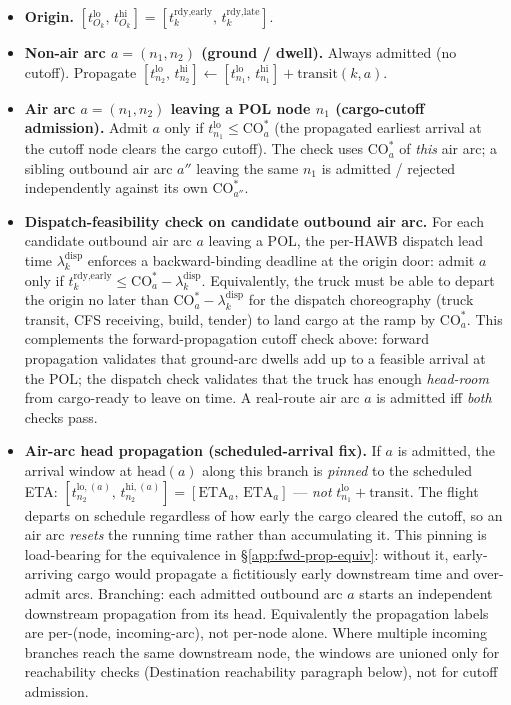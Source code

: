 \documentclass[11pt,a4paper]{article}
\theoremstyle{definition}
\begin{document}
\begin{itemize}[noitemsep]
  \item \textbf{Origin.} $[t^{\text{lo}}_{O_k},\, t^{\text{hi}}_{O_k}] =
        [t_k^{\text{rdy,early}},\, t_k^{\text{rdy,late}}]$.
  \item \textbf{Non-air arc $a = (n_1, n_2)$ (ground / dwell).} Always
        admitted (no cutoff). Propagate $[t^{\text{lo}}_{n_2},\,
        t^{\text{hi}}_{n_2}] \leftarrow [t^{\text{lo}}_{n_1},\,
        t^{\text{hi}}_{n_1}] + \text{transit}(k, a)$.
  \item \textbf{Air arc $a = (n_1, n_2)$ leaving a POL node $n_1$ (cargo-cutoff admission).}
        Admit $a$ only if $t^{\text{lo}}_{n_1} \leq \text{CO}_a^*$
        (the propagated earliest arrival at the cutoff node clears the cargo
        cutoff). The check uses $\text{CO}_a^*$ of \emph{this} air arc; a
        sibling outbound air arc $a''$ leaving the same $n_1$ is admitted /
        rejected independently against its own $\text{CO}_{a''}^*$.
  \item \textbf{Dispatch-feasibility check on candidate outbound air arc.}
        For each candidate outbound air arc $a$ leaving a POL, the
        per-HAWB dispatch lead time $\lambda^{\text{disp}}_k$ enforces a
        backward-binding deadline at the origin door: admit $a$ only if
        $t_k^{\text{rdy,early}} \leq \text{CO}_a^* - \lambda^{\text{disp}}_k$.
        Equivalently, the truck must be able to depart the origin no later
        than $\text{CO}_a^* - \lambda^{\text{disp}}_k$ for the dispatch
        choreography (truck transit, CFS receiving, build, tender) to land
        cargo at the ramp by $\text{CO}_a^*$. This complements the
        forward-propagation cutoff check above: forward propagation
        validates that ground-arc dwells add up to a feasible arrival at
        the POL; the dispatch check validates that the truck has enough
        \emph{head-room} from cargo-ready to leave on time. A real-route
        air arc $a$ is admitted iff \emph{both} checks pass.
  \item \textbf{Air-arc head propagation (scheduled-arrival fix).} If $a$ is
        admitted, the arrival window at $\text{head}(a)$ along this branch is
        \emph{pinned} to the scheduled ETA: $[t^{\text{lo},(a)}_{n_2},\,
        t^{\text{hi},(a)}_{n_2}] = [\text{ETA}_a,\, \text{ETA}_a]$ ---
        \emph{not} $t^{\text{lo}}_{n_1} + \text{transit}$. The flight departs on
        schedule regardless of how early the cargo cleared the cutoff, so an
        air arc \emph{resets} the running time rather than accumulating it.
        This pinning is load-bearing for the equivalence in
        \S\ref{app:fwd-prop-equiv}: without it, early-arriving cargo would
        propagate a fictitiously early downstream time and over-admit arcs.
        Branching: each admitted outbound
        arc $a$ starts an independent downstream propagation from its head.
        Equivalently the propagation labels are per-(node, incoming-arc), not
        per-node alone. Where multiple incoming branches reach the same
        downstream node, the windows are unioned only for reachability checks
        (Destination reachability paragraph below), not for cutoff admission.
\end{itemize}
\end{document}
